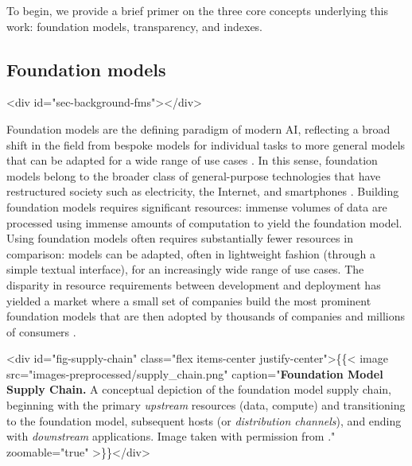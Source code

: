 \documentclass[screen, authorversion, acmsmall]{acmart}
\begin{document}
To begin, we provide a brief primer on the three core concepts underlying this work: foundation models, transparency, and indexes. 

\hypertarget{fms}{\subsection{Foundation models}}
<div id="sec-background-fms"></div>

Foundation models are the defining paradigm of modern AI, 
reflecting a broad shift in the field from bespoke models for individual tasks to more general models that can be adapted for a wide range of use cases \cite{bommasani2021opportunities}.
In this sense, foundation models belong to the broader class of general-purpose technologies that have restructured society such as electricity, the Internet, and smartphones \citep{bresnahan1995gpt, brynjolfsson2021jcurve, bommasani2021opportunities, eloundou2023gpts}. Building foundation models requires significant resources: immense volumes of data are processed using immense amounts of computation to yield the foundation model.
Using foundation models often requires substantially fewer resources in comparison: models can be adapted, often in lightweight fashion (\eg through a simple textual interface), for an increasingly wide range of use cases.
The disparity in resource requirements between development and deployment has yielded a market where a small set of companies build the most prominent foundation models that are then adopted by thousands of companies and millions of consumers \citep{bommasani2023ecosystem, vipra2023concentration, widder2023open}. 

<div id="fig-supply-chain" class="flex items-center justify-center">\{\{< image src="images-preprocessed/supply_chain.png" caption="\textbf{Foundation Model Supply Chain.}  A conceptual depiction of the foundation model supply chain, beginning with the primary \textit{upstream} resources (\ie data, compute) and transitioning to the foundation model, subsequent hosts (or \textit{distribution channels}), and ending with \textit{downstream} applications. Image taken with permission from \citet{jones2023foundationmodels}." zoomable="true" >\}\}</div>
\end{document}
